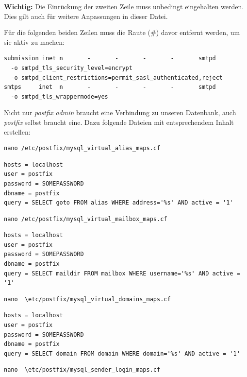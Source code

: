 \textbf{Wichtig:} Die Einrückung der zweiten Zeile muss unbedingt eingehalten werden. Dies gilt auch für weitere Anpassungen in dieser Datei.

Für die folgenden beiden Zeilen muss die Raute (\#) davor entfernt werden, um sie aktiv zu machen:

\begin{lstlisting}
submission inet n       -       -       -       -       smtpd
  -o smtpd_tls_security_level=encrypt
  -o smtpd_client_restrictions=permit_sasl_authenticated,reject
smtps     inet  n       -       -       -       -       smtpd
  -o smtpd_tls_wrappermode=yes
\end{lstlisting}


Nicht nur \textit{postfix admin} braucht eine Verbindung zu unseren Datenbank, auch \textit{postfix} selbst braucht eine. Dazu folgende Dateien mit entsprechendem Inhalt erstellen:

\begin{lstlisting}
nano /etc/postfix/mysql_virtual_alias_maps.cf
\end{lstlisting}

\begin{lstlisting}
hosts = localhost
user = postfix
password = SOMEPASSWORD
dbname = postfix
query = SELECT goto FROM alias WHERE address='%s' AND active = '1'
\end{lstlisting}

\begin{lstlisting}
nano /etc/postfix/mysql_virtual_mailbox_maps.cf
\end{lstlisting}

\begin{lstlisting}
hosts = localhost
user = postfix
password = SOMEPASSWORD
dbname = postfix
query = SELECT maildir FROM mailbox WHERE username='%s' AND active = '1'
\end{lstlisting}

\begin{lstlisting}
nano  \etc/postfix/mysql_virtual_domains_maps.cf
\end{lstlisting}

\begin{lstlisting}
hosts = localhost
user = postfix
password = SOMEPASSWORD
dbname = postfix
query = SELECT domain FROM domain WHERE domain='%s' AND active = '1'
\end{lstlisting}

\begin{lstlisting}
nano  \etc/postfix/mysql_sender_login_maps.cf
\end{lstlisting}

